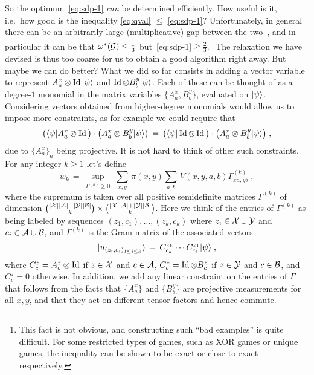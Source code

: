 So the optimum~\eqref{eq:sdp-1} \emph{can} be determined efficiently. How useful is it, i.e.\ how good is the inequality \eqref{eq:qval} $\leq$ \eqref{eq:sdp-1}? Unfortunately, in general there can be an arbitrarily large (multiplicative) gap between the two~\cite{junge2011large}, and in particular it can be that $\omega^*(\mathcal{G}) \leq \frac{1}{3}$ but~\eqref{eq:sdp-1}$\geq \frac{2}{3}$.\footnote{This fact is not obvious, and constructing such ``bad examples'' is quite difficult. For some restricted types of games, such as XOR games or unique games, the inequality can be shown to be exact or close to exact respectively.} The relaxation we have devised is thus too coarse for us to obtain a good algorithm right away. 
 But maybe we can do better? What we did so far consists in adding a vector variable to represent $A^x_a \otimes \mathop{\rm Id}\nolimits |\psi\rangle$ and $\mathop{\rm Id}\nolimits \otimes B^y_b |\psi\rangle$. Each of these can be thought of as a degree-$1$ monomial in the matrix variables $\{A^x_a,B^y_b\}$, evaluated on $|\psi\rangle$. Considering vectors obtained from higher-degree monomials would allow us to impose more constraints, as for example we could require that 
\[ \big(\langle\psi| A^x_a  \otimes \mathop{\rm Id}\nolimits \big)\cdot \big( A^x_a \otimes B^y_b |\psi\rangle\big)\,=\,  \big(\langle\psi|\mathop{\rm Id}\nolimits \otimes \mathop{\rm Id}\nolimits \big)\cdot \big( A^x_a \otimes B^y_b |\psi\rangle\big)\;,\]
due to $\{A^x_a\}_a$ being projective. It is not hard to think of other such constraints. For any integer $k\geq 1$ let's define
\begin{equation}\label{eq:opt-sdpk}
w_k\,=\, \sup_{ \Gamma^{(k)} \geq 0 } \;\sum_{x,y}\, \pi(x,y) \sum_{a,b}\, V(x,y,a,b) \Gamma^{(k)}_{xa,yb}\;,
\end{equation}
where the supremum is taken over all positive semidefinite matrices $\Gamma^{(k)}$ of dimension ${|\mathcal{X}||\mathcal{A}|+|\mathcal{Y}||\mathcal{B}| \choose k}\times {|\mathcal{X}||\mathcal{A}|+|\mathcal{Y}||\mathcal{B}| \choose k}$. Here we think of the entries of $\Gamma^{(k)}$ as being labeled by sequences $(z_1,c_1),\ldots,(z_k,c_k)$ where $z_i \in \mathcal{X}\cup\mathcal{Y}$ and $c_i \in \mathcal{A}\cup\mathcal{B}$, and $\Gamma^{(k)}$ is the Gram matrix of the associated vectors 
\[|u_{(z_i,c_i)_{1\leq i \leq k}}\rangle \,=\, C^{z_k}_{c_k} \cdots C^{z_1}_{c_1} |\psi\rangle\;,\]
where $C^z_c = A^z_c\otimes \mathop{\rm Id}\nolimits$ if $z\in \mathcal{X}$ and $c\in \mathcal{A}$, $C^z_c = \mathop{\rm Id}\nolimits \otimes B^z_c$ if $z\in \mathcal{Y}$ and $c\in \mathcal{B}$, and $C^z_c=0$ otherwise. In addition, we add any linear constraint on the entries of $\Gamma$ that follows from the facts that $\{A^x_a\}$ and $\{B^y_b\}$ are projective measurements for all $x,y$, and that they act on different tensor factors and hence commute. 

